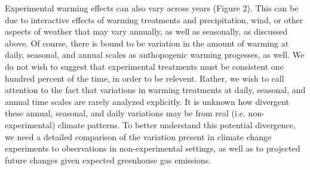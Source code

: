 \documentclass{article}
\begin{document}
\par Experimental warming effects can also vary across years  (Figure  2). This  can be due  to interactive effects of warming  treatments and  precipitation, wind, or other aspects of weather  that may  vary  annually, as well as seasonally, as discussed above. Of course, there is bound to be variation in the amount of warming at daily, seasonal, and annual scales as anthopogenic warming progesses, as well. We do not wish to suggest that experimental treatments must be consistent one hundred percent of the time, in order to be relevent. Rather, we wish to call attention to the fact that variations in warming treatments at daily, seasonal, and annual time scales are rarely analyzed explicitly.  It is unknown how divergent these annual, seasonal, and daily variations may be from real (i.e. non-experimental) climate patterns. To better understand this potential divergence, we need a detailed comparison of the variation present in climate change experiments to observations in non-experimental settings, as well as to projected future changes given expected greenhouse gas emissions.  
\end{document}
